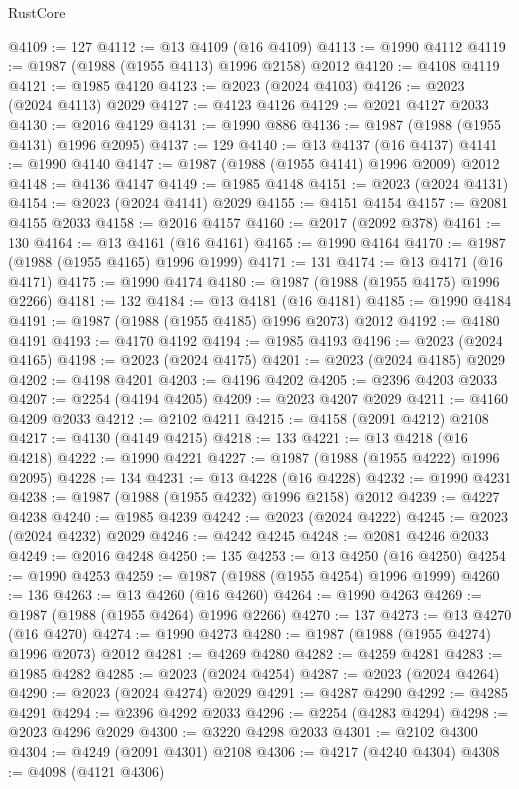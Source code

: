 \begin{lexlean}{RustCore}
\begin{coremodule}
@4109 := 127
@4112 := @13 @4109 (@16 @4109)
@4113 := @1990 @4112
@4119 := @1987 (@1988 (@1955 @4113) @1996 @2158) @2012
@4120 := @4108 @4119
@4121 := @1985 @4120
@4123 := @2023 (@2024 @4103)
@4126 := @2023 (@2024 @4113) @2029
@4127 := @4123 @4126
@4129 := @2021 @4127 @2033
@4130 := @2016 @4129
@4131 := @1990 @886
@4136 := @1987 (@1988 (@1955 @4131) @1996 @2095)
@4137 := 129
@4140 := @13 @4137 (@16 @4137)
@4141 := @1990 @4140
@4147 := @1987 (@1988 (@1955 @4141) @1996 @2009) @2012
@4148 := @4136 @4147
@4149 := @1985 @4148
@4151 := @2023 (@2024 @4131)
@4154 := @2023 (@2024 @4141) @2029
@4155 := @4151 @4154
@4157 := @2081 @4155 @2033
@4158 := @2016 @4157
@4160 := @2017 (@2092 @378)
@4161 := 130
@4164 := @13 @4161 (@16 @4161)
@4165 := @1990 @4164
@4170 := @1987 (@1988 (@1955 @4165) @1996 @1999)
@4171 := 131
@4174 := @13 @4171 (@16 @4171)
@4175 := @1990 @4174
@4180 := @1987 (@1988 (@1955 @4175) @1996 @2266)
@4181 := 132
@4184 := @13 @4181 (@16 @4181)
@4185 := @1990 @4184
@4191 := @1987 (@1988 (@1955 @4185) @1996 @2073) @2012
@4192 := @4180 @4191
@4193 := @4170 @4192
@4194 := @1985 @4193
@4196 := @2023 (@2024 @4165)
@4198 := @2023 (@2024 @4175)
@4201 := @2023 (@2024 @4185) @2029
@4202 := @4198 @4201
@4203 := @4196 @4202
@4205 := @2396 @4203 @2033
@4207 := @2254 (@4194 @4205)
@4209 := @2023 @4207 @2029
@4211 := @4160 @4209 @2033
@4212 := @2102 @4211
@4215 := @4158 (@2091 @4212) @2108
@4217 := @4130 (@4149 @4215)
@4218 := 133
@4221 := @13 @4218 (@16 @4218)
@4222 := @1990 @4221
@4227 := @1987 (@1988 (@1955 @4222) @1996 @2095)
@4228 := 134
@4231 := @13 @4228 (@16 @4228)
@4232 := @1990 @4231
@4238 := @1987 (@1988 (@1955 @4232) @1996 @2158) @2012
@4239 := @4227 @4238
@4240 := @1985 @4239
@4242 := @2023 (@2024 @4222)
@4245 := @2023 (@2024 @4232) @2029
@4246 := @4242 @4245
@4248 := @2081 @4246 @2033
@4249 := @2016 @4248
@4250 := 135
@4253 := @13 @4250 (@16 @4250)
@4254 := @1990 @4253
@4259 := @1987 (@1988 (@1955 @4254) @1996 @1999)
@4260 := 136
@4263 := @13 @4260 (@16 @4260)
@4264 := @1990 @4263
@4269 := @1987 (@1988 (@1955 @4264) @1996 @2266)
@4270 := 137
@4273 := @13 @4270 (@16 @4270)
@4274 := @1990 @4273
@4280 := @1987 (@1988 (@1955 @4274) @1996 @2073) @2012
@4281 := @4269 @4280
@4282 := @4259 @4281
@4283 := @1985 @4282
@4285 := @2023 (@2024 @4254)
@4287 := @2023 (@2024 @4264)
@4290 := @2023 (@2024 @4274) @2029
@4291 := @4287 @4290
@4292 := @4285 @4291
@4294 := @2396 @4292 @2033
@4296 := @2254 (@4283 @4294)
@4298 := @2023 @4296 @2029
@4300 := @3220 @4298 @2033
@4301 := @2102 @4300
@4304 := @4249 (@2091 @4301) @2108
@4306 := @4217 (@4240 @4304)
@4308 := @4098 (@4121 @4306)

\end{coremodule}
\end{lexlean}
